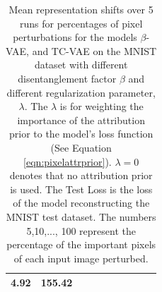\begin{table}[htbp]
\begin{tabular}{|c|clrrrrrrr|}
      \cellcolor[rgb]{ .608,  .816,  .529}4.92 &
      \cellcolor[rgb]{ .804,  .882,  .953}155.42
      \\
    \bottomrule
    \end{tabular}%
  \caption{Mean representation shifts over 5 runs for percentages of pixel perturbations for the models $\beta$-VAE, and TC-VAE on the MNIST dataset with different disentanglement factor $\beta$ and different regularization parameter, $\lambda$. The $\lambda$ is for weighting the importance of the attribution prior to the model's loss function (See Equation \ref{eqn:pixelattrprior}). $\lambda=0$ denotes that no attribution prior is used. The Test Loss is the loss of the model reconstructing the MNIST test dataset. The numbers 5,10,..., 100 represent the percentage of the important pixels of each input image perturbed.}
  \label{tab:vaespertpercmean}%
\end{table}%



